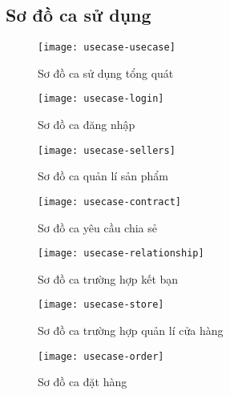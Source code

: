 \subsection{Sơ đồ ca sử dụng}
\begin{figure}[hbt!]\fontsize{13px}{13px}\selectfont
	\centering
	\texttt{[image: usecase-usecase]}
	\caption{Sơ đồ ca sử dụng tổng quát}
\end{figure}
\clearpage
\begin{figure}[hbt!]\fontsize{13px}{13px}\selectfont
	\begin{center}	
		\texttt{[image: usecase-login]}
		\caption{Sơ đồ ca đăng nhập}
	\end{center}
\end{figure}


\begin{figure}[hbt!]\fontsize{13px}{13px}\selectfont
	\begin{center}	
		\texttt{[image: usecase-sellers]}
		\caption{Sơ đồ ca quản lí sản phẩm}
	\end{center}
\end{figure}


\begin{figure}[hbt!]\fontsize{13px}{13px}\selectfont
	\begin{center}	
		\texttt{[image: usecase-contract]}
		\caption{Sơ đồ ca yêu cầu chia sẻ}
	\end{center}
\end{figure}


\begin{figure}[hbt!]\fontsize{13px}{13px}\selectfont
	\begin{center}	
		\texttt{[image: usecase-relationship]}
		\caption{Sơ đồ ca trường hợp kết bạn}
	\end{center}
\end{figure}



\begin{figure}[hbt!]\fontsize{13px}{13px}\selectfont
	\begin{center}	
		\texttt{[image: usecase-store]}
		\caption{Sơ đồ ca trường hợp quản lí cửa hàng}
	\end{center}
\end{figure}

\begin{figure}[hbt!]\fontsize{13px}{13px}\selectfont
	\begin{center}	
		\texttt{[image: usecase-order]}
		\caption{Sơ đồ ca đặt hàng}
	\end{center}
\end{figure}

